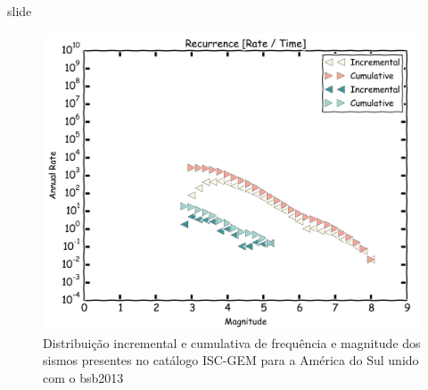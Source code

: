 \documentclass[ucs,8pt]{beamer}
\begin{document}
\begin{frame}{slide}

\begin{figure}[H]
   \centering
   \includegraphics[height=0.95\textheight]{occurrence}
   \caption[Distribuição incremental e cumulativa de frequência e magnitude dos sismos presentes no catálogo ISC-GEM
   para a América do Sul unido com o \gls{bsb2013}]
   {Distribuição incremental e cumulativa de frequência e magnitude dos sismos presentes no catálogo ISC-GEM
   para a América do Sul unido com o \gls{bsb2013}} 
   \label{f:occurrence}
\end{figure} 

\end{frame}
\end{document}
